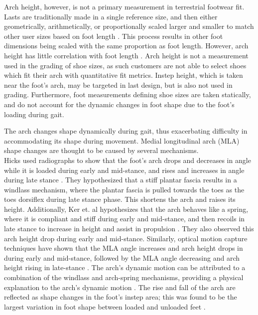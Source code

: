 \documentclass[defaultstyle,11pt]{thesis}
\begin{document}
Arch height, however, is not a primary measurement in terrestrial footwear fit.\\
Lasts are traditionally made in a single reference size, and then either geometrically, arithmetically, or proportionally scaled larger and smaller to match other user sizes based on foot length \citep{Luximon2013}.
This process results in other foot dimensions being scaled with the same proportion as foot length.
However, arch height has little correlation with foot length \citep{Hill2017}.
Arch height is not a measurement used in the grading of shoe sizes, as such customers are not able to select shoes which fit their arch with quantitative fit metrics.
Instep height, which is taken near the foot's arch, may be targeted in last design, but is also not used in grading.
Furthermore, foot measurements defining shoe sizes are taken statically, and do not account for the dynamic changes in foot shape due to the foot's loading during gait.

The arch changes shape dynamically during gait, thus exacerbating difficulty in accommodating its shape during movement.
Medial longitudinal arch (MLA) shape changes are thought to be caused by several mechanisms.\\
Hicks used radiographs to show that the foot's arch drops and decreases in angle while it is loaded during early and mid-stance, and rises and increases in angle during late stance \citep{Hicks1954}.
They hypothesized that a stiff plantar fascia results in a windlass mechanism, where the plantar fascia is pulled towards the toes as the toes dorsiflex during late stance phase.
This shortens the arch and raises its height.
Additionally, Ker et. al hypothesizes that the arch behaves like a spring, where it is compliant and stiff during early and mid-stance, and then recoils in late stance to increase in height and assist in propulsion \citep{Ker1987}.
They also observed this arch height drop during early and mid-stance.
Similarly, optical motion capture techniques have shown that the MLA angle increases and arch height drops in during early and mid-stance, followed by the MLA angle decreasing and arch height rising in late-stance \citep{Caravaggi2010, Cashmere1999, Leardini2007, Stolwijk2014}.
The arch's dynamic motion can be attributed to a combination of the windlass and arch-spring mechanisms, providing a physical explanation to the arch's dynamic motion \citep{Welte2021, Welte2018}.
The rise and fall of the arch are reflected as shape changes in the foot's instep area; this was found to be the largest variation in foot shape between loaded and unloaded feet \citep{Schuster2021}.
\end{document}

